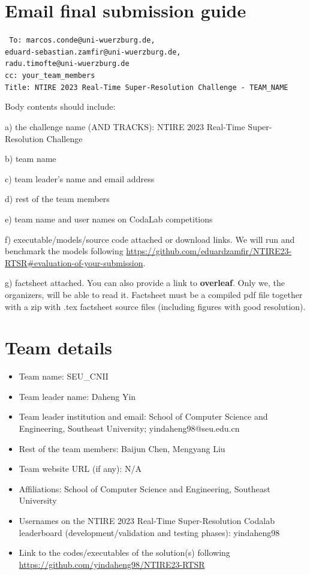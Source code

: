 \documentclass{article}
\begin{document}
\section*{Email final submission guide}

\texttt{
To: marcos.conde@uni-wuerzburg.de, \\
eduard-sebastian.zamfir@uni-wuerzburg.de, \\
radu.timofte@uni-wuerzburg.de\\
cc: your\_team\_members\\
Title: NTIRE 2023 Real-Time Super-Resolution Challenge - TEAM\_NAME\\
}

Body contents should include: 

a) the challenge name (AND TRACKS): NTIRE 2023 Real-Time Super-Resolution Challenge

b) team name 

c) team leader's name and email address 

d) rest of the team members 

e) team name and user names on CodaLab competitions 

f) executable/models/source code attached or download links. We will run and benchmark the models following \url{https://github.com/eduardzamfir/NTIRE23-RTSR#evaluation-of-your-submission}.

g) factsheet attached. You can also provide a link to \textbf{overleaf}. Only we, the organizers, will be able to read it. Factsheet must be a compiled pdf file together with a zip with .tex factsheet source files (including figures with good resolution). 

\section{Team details}

\begin{itemize}
\item Team name: SEU\_CNII
\item Team leader name: Daheng Yin
\item Team leader institution and email: School of Computer Science and Engineering, Southeast University; yindaheng98@seu.edu.cn
\item Rest of the team members: Baijun Chen, Mengyang Liu
\item Team website URL (if any): N/A
\item Affiliations: School of Computer Science and Engineering, Southeast University
\item Usernames on the NTIRE 2023 Real-Time Super-Resolution Codalab leaderboard (development/validation and testing phases): yindaheng98
\item Link to the codes/executables of the solution(s) following \url{https://github.com/yindaheng98/NTIRE23-RTSR}
\end{itemize}
\end{document}
